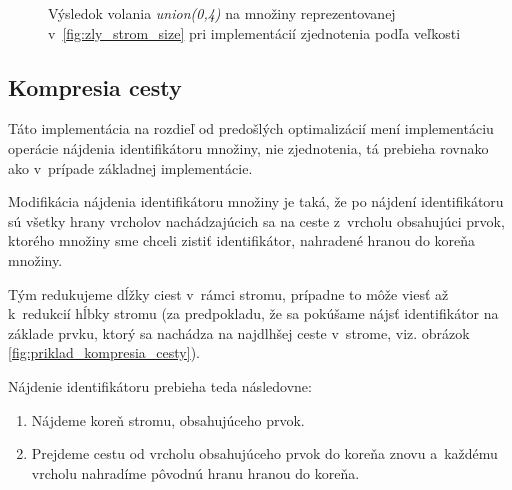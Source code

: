 \begin{figure}[H]
    \centering
    \captionsetup{justification=centering}
         
    \caption{Výsledok volania \emph{union(0,4)} na množiny reprezentovanej v~\ref{fig:zly_strom_size} pri implementácií zjednotenia podľa veľkosti}
    \label{fig:zly_priklad_zjednotenie_podľa_veľkosti}
\end{figure}

\subsection{Kompresia cesty}

Táto implementácia na rozdieľ od predošlých optimalizácií mení implementáciu operácie nájdenia identifikátoru množiny, nie zjednotenia, tá prebieha rovnako ako v~prípade základnej implementácie.

Modifikácia nájdenia identifikátoru množiny je taká, že po nájdení identifikátoru sú všetky hrany vrcholov nachádzajúcich sa na ceste z~vrcholu obsahujúci prvok, ktorého množiny sme chceli zistiť identifikátor, nahradené hranou do koreňa množiny.

Tým redukujeme dĺžky ciest v~rámci stromu, prípadne to môže viesť až k~redukcií hĺbky stromu (za predpokladu, že sa pokúšame nájsť identifikátor na základe prvku, ktorý sa nachádza na najdlhšej ceste v~strome, viz. obrázok \ref{fig:priklad_kompresia_cesty}).

Nájdenie identifikátoru prebieha teda následovne:
\begin{enumerate}
    \item Nájdeme koreň stromu, obsahujúceho prvok.
    \item Prejdeme cestu od vrcholu obsahujúceho prvok do koreňa znovu a~každému vrcholu nahradíme pôvodnú hranu hranou do koreňa.
\end{enumerate}

